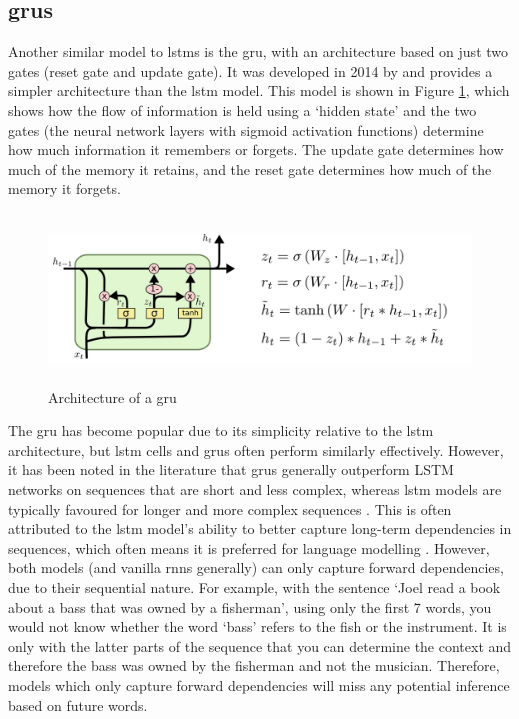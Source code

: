 \subsection{\acrlong{gru}s}\label{sec:background_grus}
Another similar model to \acrshort{lstm}s is the \acrfull {gru}, with an architecture based on just two gates (reset gate and update gate). It was developed in 2014 by \citet{cho2014learning} and provides a simpler architecture than the \acrshort{lstm} model. This model is shown in Figure \ref{fig:gru_architecture}, which shows how the flow of information is held using a `hidden state' and the two gates (the neural network layers with sigmoid activation functions) determine how much information it remembers or forgets. The update gate determines how much of the memory it retains, and the reset gate determines how much of the memory it forgets.

\begin{figure}[h]
    \centering
    \includegraphics[height=4.5cm,trim={0 0 12cm 0cm},clip]{paper/images/gru.png}
    \caption{Architecture of a \acrlong{gru} \citep{olah2015understanding}}
    \label{fig:gru_architecture}
\end{figure}

The \acrlong{gru} has become popular due to its simplicity relative to the \acrshort{lstm} architecture, but \acrshort{lstm} cells and \acrshort{gru}s often perform similarly effectively. However, it has been noted in the literature that \acrshort{gru}s generally outperform LSTM networks on sequences that are short and less complex, whereas \acrshort{lstm} models are typically favoured for longer and more complex sequences \citep{cahuantzi2023comparison}. This is often attributed to the \acrshort{lstm} model's ability to better capture long-term dependencies in sequences, which often means it is preferred for language modelling \citep{Irie2016}. However, both models (and vanilla \acrshort{rnn}s generally) can only capture forward dependencies, due to their sequential nature. For example, with the sentence `Joel read a book about a bass that was owned by a fisherman', using only the first 7 words, you would not know whether the word `bass' refers to the fish or the instrument. It is only with the latter parts of the sequence that you can determine the context and therefore the bass was owned by the fisherman and not the musician. Therefore, models which only capture forward dependencies will miss any potential inference based on future words. 


